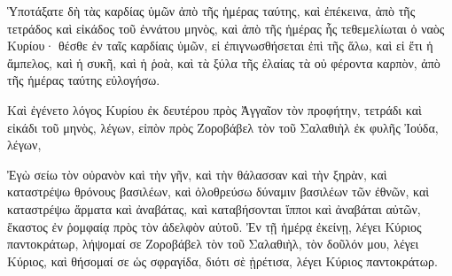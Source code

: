\begin{spacing}{1.1}
\begin{multicols}{2}
Ὑποτάξατε δὴ τὰς καρδίας ὑμῶν ἀπὸ τῆς ἡμέρας ταύτης, καὶ ἐπέκεινα, ἀπὸ τῆς τετράδος καὶ εἰκάδος τοῦ ἐννάτου μηνὸς, καὶ ἀπὸ τῆς ἡμέρας ἧς τεθεμελίωται ὁ ναὸς Κυρίου· θέσθε ἐν ταῖς καρδίαις ὑμῶν,
εἰ ἐπιγνωσθήσεται ἐπὶ τῆς ἅλω, καὶ εἰ ἔτι ἡ ἄμπελος, καὶ ἡ συκῆ, καὶ ἡ ῥοὰ, καὶ τὰ ξύλα τῆς ἐλαίας τὰ οὐ φέροντα καρπὸν, ἀπὸ τῆς ἡμέρας ταύτης εὐλογήσω.

Καὶ ἐγένετο λόγος Κυρίου ἐκ δευτέρου πρὸς Ἀγγαῖον τὸν προφήτην, τετράδι καὶ εἰκάδι τοῦ μηνὸς, λέγων,
εἰπὸν πρὸς Ζοροβάβελ τὸν τοῦ Σαλαθιὴλ ἐκ φυλῆς Ἰούδα, λέγων,

Ἐγὼ σείω τὸν οὐρανὸν καὶ τὴν γῆν, καὶ τὴν θάλασσαν καὶ τὴν ξηρὰν,
καὶ καταστρέψω θρόνους βασιλέων, καὶ ὀλοθρεύσω δύναμιν βασιλέων τῶν ἐθνῶν, καὶ καταστρέψω ἅρματα καὶ ἀναβάτας, καὶ καταβήσονται ἵπποι καὶ ἀναβάται αὐτῶν, ἕκαστος ἐν ῥομφαίᾳ πρὸς τὸν ἀδελφὸν αὐτοῦ.
Ἐν τῇ ἡμέρᾳ ἐκείνῃ, λέγει Κύριος παντοκράτωρ, λήψομαί σε Ζοροβάβελ τὸν τοῦ Σαλαθιὴλ, τὸν δοῦλόν μου, λέγει Κύριος, καὶ θήσομαί σε ὡς σφραγίδα, διότι σὲ ᾑρέτισα, λέγει Κύριος παντοκράτωρ.\end{multicols} %
\vfill
\setlength{\parindent}{0cm}
\fontsize{8}{10}

\end{spacing}
